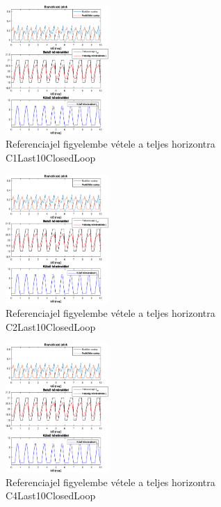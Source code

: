 \begin{figure}[H]
	\centering
	\includegraphics[width=0.35\textwidth, trim=0 0 0 0, clip,]{figures/onlab/Slope/C1Last10ClosedLoop}
	\caption{Referenciajel figyelembe vétele a teljes horizontra C1Last10ClosedLoop}
	\label{fig:onlab-refslprev2}
\end{figure}

\begin{figure}[H]
	\centering
	\includegraphics[width=0.35\textwidth, trim=0 0 0 0, clip,]{figures/onlab/Slope/C2Last10ClosedLoop}
	\caption{Referenciajel figyelembe vétele a teljes horizontra C2Last10ClosedLoop}
	\label{fig:onlab-refslprev3}
\end{figure}

\begin{figure}[H]
	\centering
	\includegraphics[width=0.35\textwidth, trim=0 0 0 0, clip,]{figures/onlab/Slope/C4Last10ClosedLoop}
	\caption{Referenciajel figyelembe vétele a teljes horizontra C4Last10ClosedLoop}
	\label{fig:onlab-refslprev4}
\end{figure}

